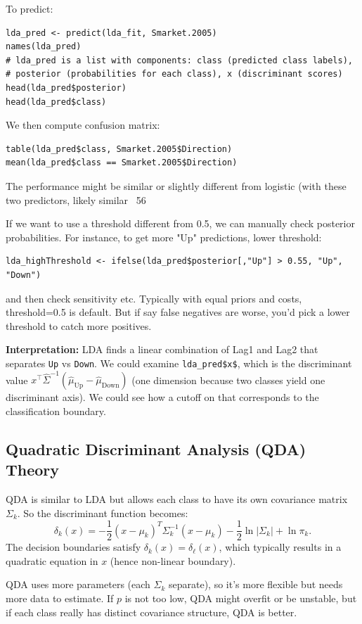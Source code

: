 \documentclass[11pt]{article}
\begin{document}
To predict:
\begin{verbatim}
lda_pred <- predict(lda_fit, Smarket.2005)
names(lda_pred)
# lda_pred is a list with components: class (predicted class labels),
# posterior (probabilities for each class), x (discriminant scores)
head(lda_pred$posterior)
head(lda_pred$class)
\end{verbatim}
We then compute confusion matrix:
\begin{verbatim}
table(lda_pred$class, Smarket.2005$Direction)
mean(lda_pred$class == Smarket.2005$Direction)
\end{verbatim}
The performance might be similar or slightly different from logistic (with these two predictors, likely similar ~56%

If we want to use a threshold different from 0.5, we can manually check posterior probabilities. For instance, to get more "Up" predictions, lower threshold:
\begin{verbatim}
lda_highThreshold <- ifelse(lda_pred$posterior[,"Up"] > 0.55, "Up", "Down")
\end{verbatim}
and then check sensitivity etc. Typically with equal priors and costs, threshold=0.5 is default. But if say false negatives are worse, you'd pick a lower threshold to catch more positives.

\textbf{Interpretation:} LDA finds a linear combination of Lag1 and Lag2 that separates \texttt{Up} vs \texttt{Down}. We could examine \texttt{lda\_pred\$x\$}, which is the discriminant value $x^\top \hat{\Sigma}^{-1}(\hat{\mu}_{\text{Up}} - \hat{\mu}_{\text{Down}})$ (one dimension because two classes yield one discriminant axis). We could see how a cutoff on that corresponds to the classification boundary.

\subsection{Quadratic Discriminant Analysis (QDA) Theory}
QDA is similar to LDA but allows each class to have its own covariance matrix $\Sigma_k$. So the discriminant function becomes:
\[ \delta_k(x) = -\frac{1}{2}(x-\mu_k)^T \Sigma_k^{-1}(x-\mu_k) - \frac{1}{2}\ln|\Sigma_k| + \ln \pi_k. \]
The decision boundaries satisfy $\delta_k(x)=\delta_\ell(x)$, which typically results in a quadratic equation in $x$ (hence non-linear boundary).

QDA uses more parameters (each $\Sigma_k$ separate), so it’s more flexible but needs more data to estimate. If $p$ is not too low, QDA might overfit or be unstable, but if each class really has distinct covariance structure, QDA is better.
\end{document}
